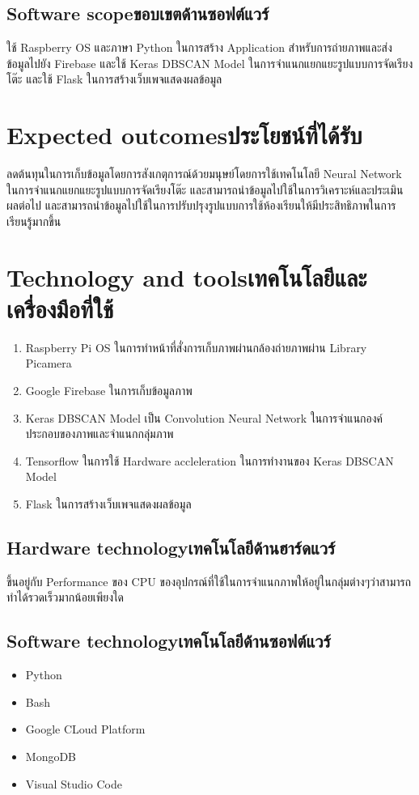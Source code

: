 \subsection{\ifenglish Software scope\else ขอบเขตด้านซอฟต์แวร์\fi}
    ใช้ Raspberry OS และภาษา Python ในการสร้าง Application สำหรับการถ่ายภาพและส่งข้อมูลไปยัง Firebase และใช้ Keras DBSCAN Model ในการจำแนกแยกแยะรูปแบบการจัดเรียงโต๊ะ 
    \enskip และใช้ Flask ในการสร้างเว็บเพจแสดงผลข้อมูล
\section{\ifenglish Expected outcomes\else ประโยชน์ที่ได้รับ\fi}
    ลดต้นทุนในการเก็บข้อมูลโดยการสังเกตุการณ์ด้วยมนุษย์โดยการใช้เทคโนโลยี Neural Network ในการจำแนกแยกแยะรูปแบบการจัดเรียงโต๊ะ และสามารถนำข้อมูลไปใช้ในการวิเคราะห์และประเมินผลต่อไป
    \enskip และสามารถนำข้อมูลไปใช้ในการปรับปรุงรูปแบบการใช้ห้องเรียนให้มีประสิทธิภาพในการเรียนรู้มากขึ้น
\section{\ifenglish Technology and tools\else เทคโนโลยีและเครื่องมือที่ใช้\fi}
    \begin{enumerate}
        \item Raspberry Pi OS ในการทำหน้าที่สั่งการเก็บภาพผ่านกล้องถ่ายภาพผ่าน Library Picamera
        \item Google Firebase ในการเก็บข้อมูลภาพ
        \item Keras DBSCAN Model เป็น Convolution Neural Network ในการจำแนกองค์ประกอบของภาพและจำแนกกลุ่มภาพ
        \item Tensorflow ในการใช้ Hardware accleleration ในการทำงานของ Keras DBSCAN Model
        \item Flask ในการสร้างเว็บเพจแสดงผลข้อมูล
    \end{enumerate}
\subsection{\ifenglish Hardware technology\else เทคโนโลยีด้านฮาร์ดแวร์\fi}
    ขึ้นอยู่กับ Performance ของ CPU ของอุปกรณ์ที่ใช้ในการจำแนกภาพให้อยู่ในกลุ่มต่างๆว่าสามารถทำได้รวดเร็วมากน้อยเพียงใด
\subsection{\ifenglish Software technology\else เทคโนโลยีด้านซอฟต์แวร์\fi}
    \begin{itemize}
        \item Python
        \item Bash
        \item Google CLoud Platform
        \item MongoDB
        \item Visual Studio Code
    \end{itemize}

